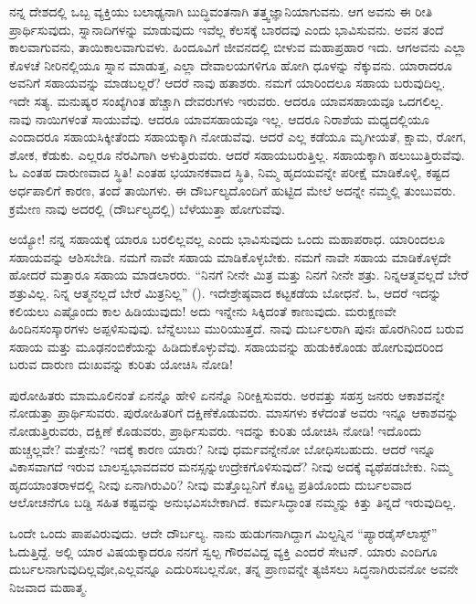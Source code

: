 ನನ್ನ ದೇಶದಲ್ಲಿ ಒಬ್ಬ ವ್ಯಕ್ತಿಯು ಬಲಾಢ್ಯನಾಗಿ ಬುದ್ಧಿವಂತನಾಗಿ ತತ್ತ್ವಜ್ಞಾನಿಯಾಗು\-ವನು. ಆಗ ಅವನು ಈ ರೀತಿ ಪ್ರಾರ್ಥಿಸುವುದು, ಸ್ನಾನಾದಿಗಳನ್ನು ಮಾಡುವುದು ಇವೆಲ್ಲ ಕೆಲಸಕ್ಕೆ ಬಾರದವು ಎಂದು ಭಾವಿಸುವನು. ಅವನ ತಂದೆ ಕಾಲವಾಗುವನು, ತಾಯಿ\break ಕಾಲವಾಗುವಳು. ಹಿಂದೂವಿಗೆ ಜೀವನದಲ್ಲಿ ಬೀಳುವ ಮಹಾಪ್ರಹಾರ ಇದು. ಆಗ\break ಅವನು ಎಲ್ಲಾ ಕೊಳಚೆ ನೀರಿನಲ್ಲಿಯೂ ಸ್ನಾನ ಮಾಡುತ್ತ, ಎಲ್ಲಾ ದೇವಾಲಯಗಳಿಗೂ ಹೋಗಿ ಧೂಳನ್ನು ನೆಕ್ಕುವನು. ಯಾರಾದರೂ ಅವನಿಗೆ ಸಹಾಯವನ್ನು ಮಾಡಬಲ್ಲರೆ? ಆದರೆ ನಾವು ಹತಾಶರು. ನಮಗೆ ಯಾರಿಂದಲೂ ಸಹಾಯ ಬರುವುದಿಲ್ಲ. ಇದೇ ಸತ್ಯ. ಮನುಷ್ಯರ ಸಂಖ್ಯೆಗಿಂತ ಹೆಚ್ಚಾಗಿ ದೇವರುಗಳು ಇರುವರು. ಆದರೂ ಯಾವ\break ಸಹಾಯವೂ ಒದಗಲಿಲ್ಲ. ನಾವು ನಾಯಿಗಳಂತೆ ಸಾಯುವೆವು. ಆದರೂ ಯಾವ\break ಸಹಾಯವೂ ಇಲ್ಲ. ಆದರೂ ನಿರಾಶೆಯ ಮಧ್ಯದಲ್ಲಿಯೂ ಎಂದಾದರೂ ಸಹಾಯ\break ಸಿಕ್ಕೀತೆಂದು ಸಹಾಯಕ್ಕಾಗಿ ನೋಡುವೆವು. ಆದರೆ ಎಲ್ಲ ಕಡೆಯೂ ಮೃಗೀಯತೆ, ಕ್ಷಾಮ, ರೋಗ, ಶೋಕ, ಕೆಡುಕು. ಎಲ್ಲರೂ ನೆರವಿಗಾಗಿ ಅಳುತ್ತಿರುವರು. ಆದರೆ ಸಹಾಯ\break ಬರುತ್ತಿಲ್ಲ. ಸಹಾಯಕ್ಕಾಗಿ ಹಲುಬುತ್ತಿರುವೆವು. ಓ ಎಂತಹ ದಾರುಣವಾದ ಸ್ಥಿತಿ! ಎಂತಹ ಭಯಾನಕವಾದ ಸ್ಥಿತಿ, ನಿಮ್ಮ ಹೃದಯವನ್ನೇ ಪರೀಕ್ಷೆ ಮಾಡಿಕೊಳ್ಳಿ, ಕಷ್ಟದ ಅರ್ಧಪಾಲಿಗೆ ಕಾರಣ, ತಂದೆ ತಾಯಿಗಳು. ಈ ದೌರ್ಬಲ್ಯದೊಂದಿಗೆ ಹುಟ್ಟಿದ ಮೇಲೆ ಅದನ್ನೇ ನಮ್ಮಲ್ಲಿ ತುಂಬುವರು. ಕ್ರಮೇಣ ನಾವು ಅದರಲ್ಲಿ (ದೌರ್ಬಲ್ಯದಲ್ಲಿ) ಬೆಳೆಯುತ್ತಾ ಹೋಗುವೆವು.

ಅಯ್ಯೋ! ನನ್ನ ಸಹಾಯಕ್ಕೆ ಯಾರೂ ಬರಲಿಲ್ಲವಲ್ಲ ಎಂದು ಭಾವಿಸುವುದು ಒಂದು ಮಹಾಪರಾಧ. ಯಾರಿಂದಲೂ ಸಹಾಯವನ್ನು ಆಶಿಸಬೇಡಿ. ನಮಗೆ ನಾವೇ ಸಹಾಯ ಮಾಡಿಕೊಳ್ಳಬೇಕು. ನಮಗೆ ನಾವೇ ಸಹಾಯ ಮಾಡಿಕೊಳ್ಳದೇ ಹೋದರೆ ಮತ್ತಾರೂ ಸಹಾಯ ಮಾಡಲಾರರು. “ನಿನಗೆ ನೀನೇ ಮಿತ್ರ ಮತ್ತು ನಿನಗೆ ನೀನೇ ಶತ್ರು. ನಿನ್ನ\break ಆತ್ಮವಲ್ಲದೆ ಬೇರೆ ಶತ್ರುವಿಲ್ಲ. ನಿನ್ನ ಆತ್ಮನಲ್ಲದೆ ಬೇರೆ ಮಿತ್ರನಿಲ್ಲ” (). ಇದೇ\break ಶ್ರೇಷ್ಠವಾದ ಕಟ್ಟಕಡೆಯ ಬೋಧನೆ. ಓ, ಆದರೆ ಇದನ್ನು ಕಲಿಯಲು ಎಷ್ಟೊಂದು ಕಾಲ ಹಿಡಿಯುವುದು! ಅದು ಇನ್ನೇನು ಸಿಕ್ಕಿದಂತೆ ಕಾಣುವುದು. ಮರುಕ್ಷಣವೇ ಹಿಂದಿನ\break ಸಂಸ್ಕಾರಗಳು ಅಪ್ಪಳಿಸುವುವು. ಬೆನ್ನೆಲುಬು ಮುರಿಯುತ್ತದೆ. ನಾವು ದುರ್ಬಲರಾಗಿ ಪುನಃ ಹೊರಗಿನಿಂದ ಬರುವ ಸಹಾಯ ಮತ್ತು ಮೂಢನಂಬಿಕೆಯನ್ನು ಹಿಡಿದುಕೊಳ್ಳುವೆವು. ಸಹಾಯವನ್ನು ಹುಡುಕಿಕೊಂಡು ಹೋಗುವುದರಿಂದ ಬರುವ ದಾರುಣ ದುಃಖವನ್ನು ಕುರಿತು ಯೋಚಿಸಿ ನೋಡಿ!

ಪುರೋಹಿತರು ಮಾಮೂಲಿನಂತೆ ಏನನ್ನೊ ಹೇಳಿ ಏನನ್ನೊ ನಿರೀಕ್ಷಿಸುವರು. ಅರವತ್ತು ಸಹಸ್ರ ಜನರು ಆಕಾಶವನ್ನೇ ನೋಡುತ್ತಾ ಪ್ರಾರ್ಥಿಸುವರು. ಪುರೋಹಿತರಿಗೆ ದಕ್ಷಿಣೆ\break ಕೊಡುವರು. ಮಾಸಗಳು ಕಳೆದಂತೆ ಅವರು ಇನ್ನೂ ಆಕಾಶವನ್ನು ನೋಡುತ್ತಿರುವರು, ದಕ್ಷಿಣೆ ಕೊಡುವರು, ಪ್ರಾರ್ಥಿಸುವರು. ಇದನ್ನು ಕುರಿತು ಯೋಚಿಸಿ ನೋಡಿ! ಇದೊಂದು ಹುಚ್ಚಲ್ಲವೇ? ಮತ್ತೇನು? ಇದಕ್ಕೆ ಕಾರಣ ಯಾರು? ನೀವು ಧರ್ಮವನ್ನೇನೋ ಬೋಧಿಸಬಹುದು. ಆದರೆ ಇನ್ನೂ ವಿಕಾಸವಾಗದೆ ಇರುವ ಬಾಲಸ್ವಭಾವದವರ ಮನಸ್ಸನ್ನು\break ಉದ್ರೇಕಗೊಳಿಸುವುದೆ? ನೀವು ಅದಕ್ಕೆ ವ್ಯಥೆಪಡಬೇಕು. ನಿಮ್ಮ ಹೃದಯಾಂತರಾಳದಲ್ಲಿ ನೀವು ಏನಾಗಿರುವಿರಿ? ನೀವು ಮತ್ತೊಬ್ಬನಿಗೆ ಕೊಟ್ಟ ಪ್ರತಿಯೊಂದು ದುರ್ಬಲವಾದ ಆಲೋಚನೆಗೂ ಬಡ್ಡಿ ಸಹಿತ ಕಷ್ಟವನ್ನು ಅನುಭವಿಸಬೇಕಾಗಿದೆ. ಕರ್ಮಸಿದ್ಧಾಂತ ನಮ್ಮನ್ನು ಕಿತ್ತು ತಿನ್ನದೆ ಇರುವುದಿಲ್ಲ.

ಒಂದೇ ಒಂದು ಪಾಪವಿರುವುದು. ಆದೇ ದೌರ್ಬಲ್ಯ. ನಾನು ಹುಡುಗನಾಗಿದ್ದಾಗ ಮಿಲ್ಟನ್ನಿನ “ಪ್ಯಾರಡೈಸ್​ ಲಾಸ್ಟ್​” ಓದುತ್ತಿದ್ದೆ. ಅಲ್ಲಿ ಯಾರ ವಿಷಯಕ್ಕಾದರೂ ನನಗೆ ಸ್ವಲ್ಪ ಗೌರವವಿದ್ದ ವ್ಯಕ್ತಿ ಎಂದರೆ ಸೇಟನ್​. ಯಾರು ಎಂದಿಗೂ ದುರ್ಬಲನಾಗುವುದಿಲ್ಲವೋ,\break ಎಲ್ಲವನ್ನೂ ಎದುರಿಸಬಲ್ಲನೋ, ತನ್ನ ಪ್ರಾಣವನ್ನೇ ತ್ಯಜಿಸಲು ಸಿದ್ಧನಾಗಿರುವನೋ ಅವನೇ ನಿಜವಾದ ಮಹಾತ್ಮ.

